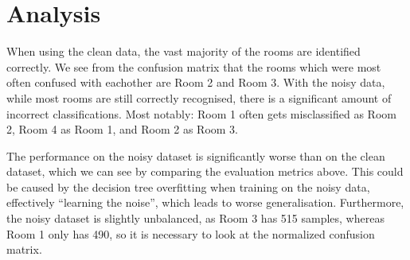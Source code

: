 \documentclass[a4paper, 11pt]{article}
\begin{document}
\section{Analysis}

When using the clean data, the vast majority of the rooms are identified
correctly. We see from the confusion matrix that the rooms which were most
often confused with eachother are Room 2 and Room 3. With the noisy data,
while most rooms are still correctly recognised, there is a significant
amount of incorrect classifications. Most notably: Room 1 often gets misclassified as
Room 2, Room 4 as Room 1, and Room 2 as Room 3.
\

The performance on the noisy dataset is significantly worse than on the clean
dataset, which we can see by comparing the evaluation metrics above. This
could be caused by the decision tree overfitting when training on the noisy
data, effectively ``learning the noise'', which leads to worse generalisation.
Furthermore, the noisy dataset is slightly unbalanced, as Room 3 has 515
samples, whereas Room 1 only has 490, so it is necessary to look at the
normalized confusion matrix.
\end{document}

